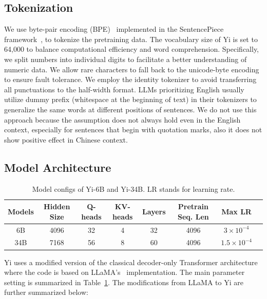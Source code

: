 \subsection{Tokenization}
We use byte-pair encoding (BPE)~\citep{shibata1999byte} implemented in the SentencePiece framework~\citep{kudo2018sentencepiece}, to tokenize the pretraining data.
The vocabulary size of Yi is set to 64,000 to balance computational efficiency and word comprehension.
Specifically, we split numbers into individual digits to facilitate a better understanding of numeric data.
We allow rare characters to fall back to the unicode-byte encoding to ensure fault tolerance.
We employ the identity tokenizer to avoid transferring all punctuations to the half-width format.
LLMs prioritizing English usually utilize dummy prefix (whitespace at the beginning of text) in their tokenizers to generalize the same words at different positions of sentences.
We do not use this approach because the assumption does not always hold even in the English context, especially for sentences that begin with quotation marks, also it does not show positive effect in Chinese context.

\subsection{Model Architecture}
\begin{table}[t!]
    \centering
    \begin{tabular}{@{}cccccccc@{}}
        \toprule
         Models&  Hidden Size&  Q-heads&  KV-heads&  Layers&  Pretrain Seq. Len& Max LR\\
         \midrule
         6B&  4096&  32&  4&  32&  4096& $3\times10^{-4}$\\
         34B&  7168&  56&  8&  60&  4096& $1.5\times10^{-4}$\\
         \bottomrule
    \end{tabular}
    \space
    \caption{Model configs of Yi-6B and Yi-34B. LR stands for learning rate.}
    \label{tab:model_config}
\end{table}
Yi uses a modified version of the classical decoder-only Transformer architecture~\citep{Vaswani:2017aa} where the code is based on LLaMA's~\citep{llama2} implementation. 
The main parameter setting is summarized in Table~\ref{tab:model_config}. 
The modifications from LLaMA to Yi are further summarized below:

